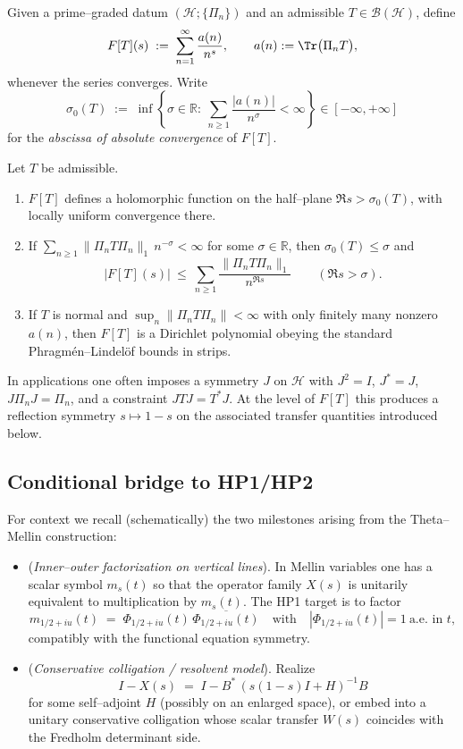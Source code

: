 \begin{definition}
Given a prime–graded datum $(\mathcal H;\{\Pi_n\})$ and an admissible $T\in\mathcal B(\mathcal H)$, define
\[
F[T](s)\;:=\;\sum_{n=1}^{\infty}\frac{a(n)}{n^{s}},\qquad 
a(n):=\Tr\bigl(\Pi_n T\bigr),
\]
whenever the series converges. Write
\[
\sigma_0(T)\;:=\;\inf\left\{\sigma\in\mathbb R:\ \sum_{n\ge1}\frac{|a(n)|}{n^\sigma}<\infty\right\}\in[-\infty,+\infty]
\]
for the \emph{abscissa of absolute convergence} of $F[T]$.
\end{definition}

\begin{proposition}
Let $T$ be admissible.
\begin{enumerate}
\item $F[T]$ defines a holomorphic function on the half–plane $\Re s>\sigma_0(T)$, with locally uniform convergence there.
\item If $\sum_{n\ge1}\|\Pi_n T\Pi_n\|_1\,n^{-\sigma}<\infty$ for some $\sigma\in\mathbb R$, then $\sigma_0(T)\le\sigma$ and
\[
|F[T](s)|\ \le\ \sum_{n\ge1}\frac{\|\Pi_n T\Pi_n\|_1}{n^{\Re s}}\qquad(\Re s>\sigma).
\]
\item If $T$ is normal and $\sup_{n}\|\Pi_n T\Pi_n\|<\infty$ with only finitely many nonzero $a(n)$, then $F[T]$ is a Dirichlet polynomial obeying the standard Phragmén–Lindelöf bounds in strips.
\end{enumerate}
\end{proposition}

\begin{remark}
In applications one often imposes a symmetry $J$ on $\mathcal H$ with $J^2=I$, $J^*=J$, $J\Pi_nJ=\Pi_n$, and a constraint $JTJ=T^*J$. At the level of $F[T]$ this produces a reflection symmetry $s\mapsto 1-s$ on the associated transfer quantities introduced below.
\end{remark}

\subsection{Conditional bridge to HP1/HP2}

For context we recall (schematically) the two milestones arising from the Theta–Mellin construction:
\begin{itemize}
\item[\textbf{HP1}] (\emph{Inner–outer factorization on vertical lines}). In Mellin variables one has a scalar symbol $m_s(t)$ so that the operator family $X(s)$ is unitarily equivalent to multiplication by $m_s(t)$. The HP1 target is to factor
\[
m_{1/2+iu}(t)\;=\;\Phi_{1/2+iu}(t)\,\overline{\Phi_{1/2+iu}(t)}\quad\text{with}\quad |\Phi_{1/2+iu}(t)|=1\ \text{a.e.\ in $t$},
\]
compatibly with the functional equation symmetry.
\item[\textbf{HP2}] (\emph{Conservative colligation / resolvent model}). Realize
\[
I-X(s)\;=\;I-B^*\,(s(1-s)I+H)^{-1}B
\]
for some self–adjoint $H$ (possibly on an enlarged space), or embed into a unitary conservative colligation whose scalar transfer $W(s)$ coincides with the Fredholm determinant side.
\end{itemize}


